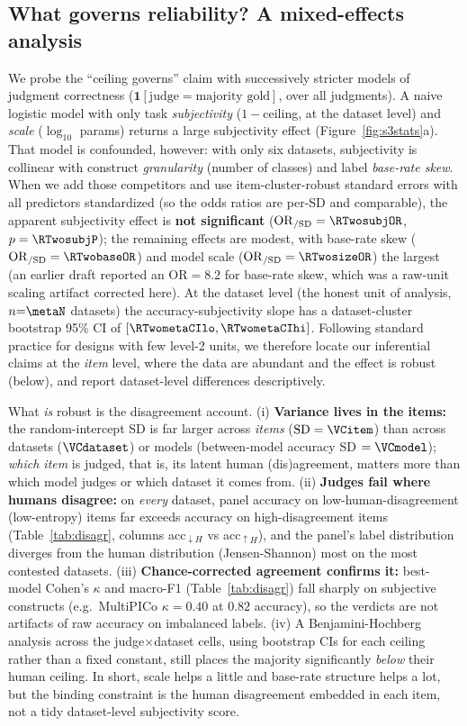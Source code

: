 \subsection{What governs reliability? A mixed-effects analysis}
We probe the ``ceiling governs'' claim with successively stricter models of judgment correctness
($\mathbf{1}[\text{judge}=\text{majority gold}]$, over all \STHRn{} judgments). A naive logistic model with only task
\emph{subjectivity} ($1\!-\!$ceiling, at the dataset level) and \emph{scale} ($\log_{10}$ params) returns a large
subjectivity effect (Figure~\ref{fig:s3stats}a). That model is confounded, however: with only six datasets,
subjectivity is collinear with construct \emph{granularity} (number of classes) and label \emph{base-rate skew}.
When we add those competitors and use item-cluster-robust standard errors with all predictors standardized (so the
odds ratios are per-SD and comparable), the apparent subjectivity effect is \textbf{not significant}
($\mathrm{OR}_{/\mathrm{SD}}=\RTwosubjOR$, $p=\RTwosubjP$); the remaining effects are modest, with base-rate skew
($\mathrm{OR}_{/\mathrm{SD}}=\RTwobaseOR$) and model scale ($\mathrm{OR}_{/\mathrm{SD}}=\RTwosizeOR$) the largest
(an earlier draft reported an $\mathrm{OR}{=}8.2$ for base-rate skew, which was a raw-unit scaling artifact corrected
here). At the dataset level (the honest unit of analysis, $n{=}\metaN$ datasets) the accuracy-subjectivity slope has
a dataset-cluster bootstrap 95\% CI of $[\RTwometaCIlo,\RTwometaCIhi]$. Following standard practice for designs with
few level-2 units, we therefore locate our inferential claims at the \emph{item} level, where the data are abundant
and the effect is robust (below), and report dataset-level differences descriptively.

What \emph{is} robust is the disagreement account. (i) \textbf{Variance lives in the items:} the random-intercept SD
is far larger across \emph{items} ($\mathrm{SD}=\VCitem$) than across datasets ($\VCdataset$) or models
(between-model accuracy SD $=\VCmodel$); \emph{which item} is judged, that is, its latent human (dis)agreement,
matters more than which model judges or which dataset it comes from. (ii) \textbf{Judges fail where humans disagree:}
on \emph{every} dataset, panel accuracy on low-human-disagreement (low-entropy) items far exceeds accuracy on
high-disagreement items (Table~\ref{tab:disagr}, columns acc$_{\downarrow H}$ vs acc$_{\uparrow H}$), and the panel's
label distribution diverges from the human distribution (Jensen-Shannon) most on the most contested datasets.
(iii) \textbf{Chance-corrected agreement confirms it:} best-model Cohen's $\kappa$ and macro-F1
(Table~\ref{tab:disagr}) fall sharply on subjective constructs (e.g.\ MultiPICo $\kappa{=}0.40$ at $0.82$ accuracy),
so the verdicts are not artifacts of raw accuracy on imbalanced labels. (iv) A Benjamini-Hochberg analysis across the
\SMEfdrtests{} judge$\times$dataset cells, using bootstrap CIs for each ceiling rather than a fixed constant, still
places the majority significantly \emph{below} their human ceiling. In short, scale helps a little and base-rate
structure helps a lot, but the binding constraint is the human disagreement embedded in each item, not a tidy
dataset-level subjectivity score.

